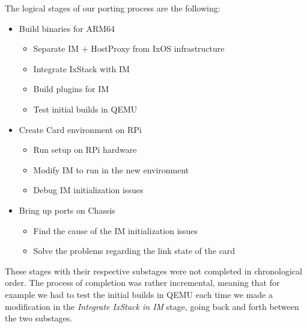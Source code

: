 

The logical stages of our porting process are the following:
\begin{itemize}
    \item Build binaries for ARM64
    \begin{itemize}
        \item Separate IM + HostProxy from IxOS infrastructure
        \item Integrate IxStack with IM
        \item Build plugins for IM
        \item Test initial builds in QEMU
    \end{itemize}
    \item Create Card environment on RPi
    \begin{itemize}
        \item Run setup on RPi hardware
        \item Modify IM to run in the new environment
        \item Debug IM initialization issues
    \end{itemize}
    \item Bring up ports on Chassis
    \begin{itemize}
        \item Find the cause of the IM initialization issues
        \item Solve the problems regarding the link state of the card
    \end{itemize}
\end{itemize}
These stages with their respective substages were not completed in chronological
order. The process of completion was rather incremental, meaning that for
example we had to test the initial builds in QEMU each time we made a
modification in the \textit{Integrate IxStack in IM} stage, going back and forth
between the two substages.

